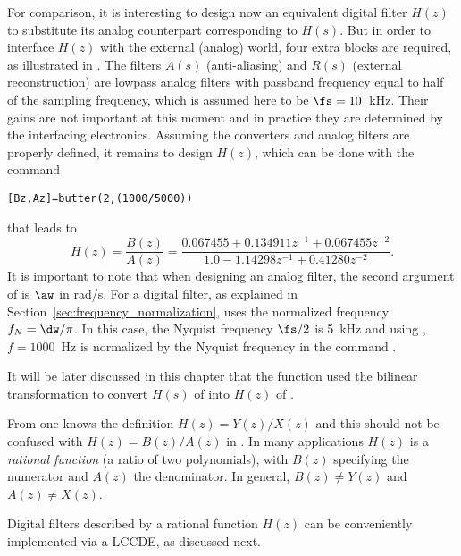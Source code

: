 For comparison, it is interesting to design now an equivalent digital filter $H(z)$ to substitute its analog counterpart corresponding to $H(s)$. But in order to interface $H(z)$ with the external (analog) world, four extra blocks are required, as illustrated in . The filters $A(s)$ (anti-aliasing) and $R(s)$ (external reconstruction) are lowpass analog filters with passband frequency equal to half of the sampling frequency, which is assumed here to be $\fs = 10$~kHz. Their gains are not important at this moment and in practice they are determined by the interfacing electronics.
Assuming the converters and analog filters are properly defined, it remains to design $H(z)$, which can be done with the command
\begin{lstlisting}
[Bz,Az]=butter(2,(1000/5000))
\end{lstlisting}
that leads to
\begin{equation}
H(z) = \frac{B(z)}{A(z)} = \frac{0.067455  + 0.134911  z^{-1} + 0.067455 z^{-2}}{1.0  -1.14298 z^{-1}  + 0.41280 z^{-2}}.
\label{eq:butter_digital}
\end{equation}
It is important to note that when designing an analog filter, the second argument of  is $\aw$ in rad/s. For a digital filter, as explained in Section~\ref{sec:frequency_normalization}, {\matlab} uses the normalized frequency $f_N = \dw/\pi$.
In this case, the Nyquist frequency $\fs/2$ is 5~kHz and using , $f=1000$~Hz is normalized by the Nyquist frequency in the command .

It will be later discussed in this chapter that the function  used the bilinear transformation to convert $H(s)$ of  into $H(z)$ of .

From  one knows the definition $H(z)=Y(z)/X(z)$ and this should not be confused with $H(z)=B(z)/A(z)$ in .  In many applications $H(z)$ is a \emph{rational function} (a ratio of two polynomials), with $B(z)$ specifying the numerator and $A(z)$ the denominator. In general, $B(z) \ne Y(z)$ and $A(z) \ne X(z)$. 

Digital filters described by a rational function $H(z)$ can be conveniently implemented via a LCCDE, as discussed next.

